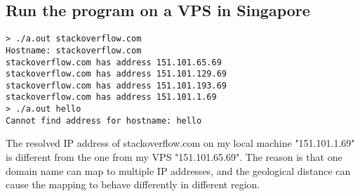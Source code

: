 \documentclass[12pt]{article}
\begin{document}
\subsection{Run the program on a VPS in Singapore}
\begin{verbatim}
> ./a.out stackoverflow.com
Hostname: stackoverflow.com
stackoverflow.com has address 151.101.65.69
stackoverflow.com has address 151.101.129.69
stackoverflow.com has address 151.101.193.69
stackoverflow.com has address 151.101.1.69
> ./a.out hello
Cannot find address for hostname: hello
\end{verbatim}

The resolved IP address of stackoverflow.com on my local machine "151.101.1.69" is different from the one from my VPS "151.101.65.69". The reason is that one domain name can map to multiple IP addresses, and the geological distance can cause the mapping to behave differently in different region.
\end{document}
